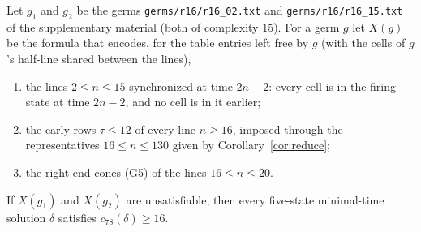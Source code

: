 
\begin{proposition}\label{prop:germs16}
Let $g_1$ and $g_2$ be the germs \texttt{germs/r16/r16\_02.txt} and \texttt{germs/r16/r16\_15.txt} of the
supplementary material (both of complexity $15$). For a germ $g$ let $X(g)$ be the formula that encodes, for the
table entries left free by $g$ (with the cells of $g$'s half-line shared between the lines),
\begin{enumerate}
  \item[(a)] the lines $2\le n\le 15$ synchronized at time $2n-2$: every cell is in the firing state at
        time $2n-2$, and no cell is in it earlier;
  \item[(b)] the early rows $\tau\le 12$ of every line $n\ge 16$, imposed through the representatives
        $16\le n\le 130$ given by Corollary~\ref{cor:reduce};
  \item[(c)] the right-end cones \textup{(G5)} of the lines $16\le n\le 20$.
\end{enumerate}
If $X(g_1)$ and $X(g_2)$ are unsatisfiable, then every five-state minimal-time solution $\delta$ satisfies
$c_{78}(\delta)\ge 16$.
\end{proposition}

